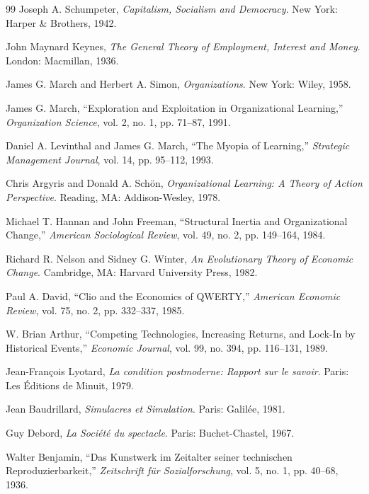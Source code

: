 \documentclass[11pt,oneside]{book}
\theoremstyle{definition}
\theoremstyle{remark}
\begin{document}
\begin{thebibliography}{99}
 Joseph A. Schumpeter, \emph{Capitalism, Socialism and Democracy}. New York: Harper \& Brothers,
  1942.

 John Maynard Keynes, \emph{The General Theory of Employment, Interest and Money}. London:
  Macmillan, 1936.

 James G. March and Herbert A. Simon, \emph{Organizations}. New York: Wiley, 1958.

 James G. March, ``Exploration and Exploitation in Organizational Learning,'' \emph{Organization
  Science}, vol. 2, no. 1, pp. 71--87, 1991.

 Daniel A. Levinthal and James G. March, ``The Myopia of Learning,'' \emph{Strategic Management
  Journal}, vol. 14, pp. 95--112, 1993.

 Chris Argyris and Donald A. Sch\"on, \emph{Organizational Learning: A Theory of Action
  Perspective}. Reading, MA: Addison-Wesley, 1978.

 Michael T. Hannan and John Freeman, ``Structural Inertia and Organizational Change,''
  \emph{American Sociological Review}, vol. 49, no. 2, pp. 149--164, 1984.

 Richard R. Nelson and Sidney G. Winter, \emph{An Evolutionary Theory of Economic Change}.
  Cambridge, MA: Harvard University Press, 1982.

 Paul A. David, ``Clio and the Economics of QWERTY,'' \emph{American Economic Review}, vol. 75,
  no. 2, pp. 332--337, 1985.

 W. Brian Arthur, ``Competing Technologies, Increasing Returns, and Lock-In by Historical
  Events,'' \emph{Economic Journal}, vol. 99, no. 394, pp. 116--131, 1989.

 Jean-Fran\c{c}ois Lyotard, \emph{La condition postmoderne: Rapport sur le savoir}. Paris: Les
  \'Editions de Minuit, 1979.

 Jean Baudrillard, \emph{Simulacres et Simulation}. Paris: Galil\'ee, 1981.

 Guy Debord, \emph{La Soci\'et\'e du spectacle}. Paris: Buchet-Chastel, 1967.

 Walter Benjamin, ``Das Kunstwerk im Zeitalter seiner technischen Reproduzierbarkeit,''
  \emph{Zeitschrift f\"ur Sozialforschung}, vol. 5, no. 1, pp. 40--68, 1936.


\end{thebibliography}
\end{document}
